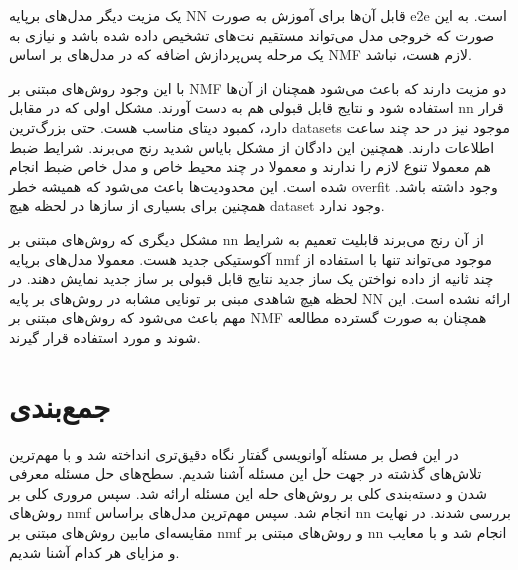 یک مزیت دیگر مدل‌های برپایه \gls{NN} قابل آن‌ها برای آموزش به صورت \gls{e2e}
است. به این صورت که خروجی مدل می‌تواند مستقیم نت‌های تشخیص داده شده باشد و نیازی
به یک مرحله پس‌پردازش اضافه که در مدل‌های بر اساس \gls{NMF} لازم هست، نباشد.

با این وجود روش‌های مبتنی بر \gls{NMF} دو مزیت دارند که باعث می‌شود همچنان از
آن‌ها استفاده شود و نتایج قابل قبولی هم به دست آورند. مشکل اولی که در مقابل
\gls{nn} قرار دارد، کمبود دیتای مناسب هست. حتی بزرگ‌ترین \glspl{dataset} موجود
نیز در حد چند ساعت اطلاعات دارند. همچنین این دادگان از مشکل بایاس شدید رنج
می‌برند. شرایط ضبط هم معمولا تنوع لازم را ندارند و معمولا در چند محیط خاص و مدل
خاص ضبط انجام شده است. این محدودیت‌ها باعث می‌شود که همیشه خطر \gls{overfit}
وجود داشته باشد. همچنین برای بسیاری از سازها در لحظه هیچ \gls{dataset} وجود
ندارد.

مشکل دیگری که روش‌های مبتنی بر \gls{nn} از آن رنج می‌برند قابلیت تعمیم به شرایط
آکوستیکی جدید هست. معمولا مدل‌های برپایه \gls{nmf} موجود می‌تواند تنها با
استفاده از چند ثانیه از داده نواختن یک ساز جدید نتایج قابل قبولی بر ساز جدید
نمایش دهند. در لحظه هیچ شاهدی مبنی بر تونایی مشابه در روش‌های بر پایه \gls{NN}
ارائه نشده است. این مهم باعث می‌شود که روش‌های مبتنی بر \gls{NMF} همچنان به صورت
گسترده مطالعه شوند و مورد استفاده قرار گیرند.

\section{جمع‌بندی}
در این فصل بر مسئله آوانویسی گفتار نگاه دقیق‌تری انداخته شد و با مهم‌ترین
تلاش‌های گذشته در جهت حل این مسئله آشنا شدیم. سطح‌های حل مسئله معرفی شدن و
دسته‌بندی کلی بر روش‌های حله این مسئله ارائه شد. سپس مروری کلی بر روش‌های
\gls{nmf} انجام شد. سپس مهم‌ترین مدل‌های براساس \gls{nn} بررسی شدند. در نهایت
مقایسه‌ای مابین روش‌های مبتنی بر \gls{nmf} و روش‌های مبتنی بر \gls{nn} انجام شد
و با معایب و مزایای هر کدام آشنا شدیم.